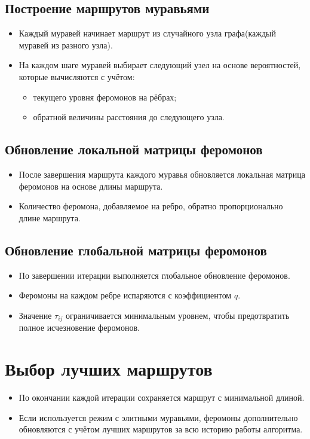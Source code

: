 \subsection*{Построение маршрутов муравьями}
\begin{itemize}
	\item Каждый муравей начинает маршрут из случайного узла графа(каждый муравей из разного узла).
	\item На каждом шаге муравей выбирает следующий узел на основе вероятностей, которые вычисляются с учётом:
	\begin{itemize}
		\item текущего уровня феромонов на рёбрах;
		\item обратной величины расстояния до следующего узла.
	\end{itemize}
\end{itemize}

\subsection*{Обновление локальной матрицы феромонов}
\begin{itemize}
	\item После завершения маршрута каждого муравья обновляется локальная матрица феромонов на основе длины маршрута.
	\item Количество феромона, добавляемое на ребро, обратно пропорционально длине маршрута.
\end{itemize}

\subsection*{Обновление глобальной матрицы феромонов}
\begin{itemize}
	\item По завершении итерации выполняется глобальное обновление феромонов.
	\item Феромоны на каждом ребре испаряются с коэффициентом $q$.
	\item Значение $\tau_{ij}$ ограничивается минимальным уровнем, чтобы предотвратить полное исчезновение феромонов.
\end{itemize}

\section*{Выбор лучших маршрутов}
\begin{itemize}
	\item По окончании каждой итерации сохраняется маршрут с минимальной длиной.
	\item Если используется режим с элитными муравьями, феромоны дополнительно обновляются с учётом лучших маршрутов за всю историю работы алгоритма.
\end{itemize}

